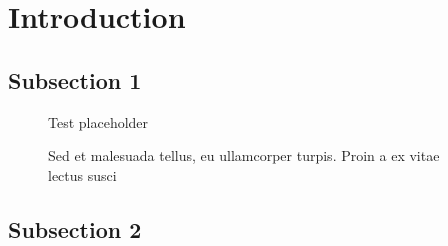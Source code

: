 \section{Introduction}
\lipsum[1]
\subsection{Subsection 1}
\lipsum [3-4]


\begin{figure}[th!]
    \centering
    Test placeholder
    \caption[This is a caption for the list of figures]{Sed et malesuada tellus, eu ullamcorper turpis. Proin a ex vitae lectus susci}
    \label{testfig}
\end{figure}

\subsection{Subsection 2}
\lipsum[5-8]